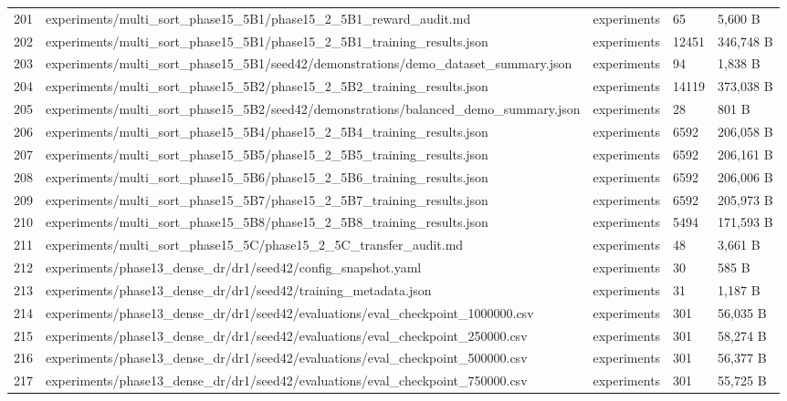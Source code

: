 \documentclass[11pt,a4paper,oneside]{book}
\begin{document}
\begin{longtable}{l l l l l}
201 & experiments/multi\_sort\_phase15\_5B1/phase15\_2\_5B1\_reward\_audit.md & experiments & 65 & 5,600 B \\
202 & experiments/multi\_sort\_phase15\_5B1/phase15\_2\_5B1\_training\_results.json & experiments & 12451 & 346,748 B \\
203 & experiments/multi\_sort\_phase15\_5B1/seed42/demonstrations/demo\_dataset\_summary.json & experiments & 94 & 1,838 B \\
204 & experiments/multi\_sort\_phase15\_5B2/phase15\_2\_5B2\_training\_results.json & experiments & 14119 & 373,038 B \\
205 & experiments/multi\_sort\_phase15\_5B2/seed42/demonstrations/balanced\_demo\_summary.json & experiments & 28 & 801 B \\
206 & experiments/multi\_sort\_phase15\_5B4/phase15\_2\_5B4\_training\_results.json & experiments & 6592 & 206,058 B \\
207 & experiments/multi\_sort\_phase15\_5B5/phase15\_2\_5B5\_training\_results.json & experiments & 6592 & 206,161 B \\
208 & experiments/multi\_sort\_phase15\_5B6/phase15\_2\_5B6\_training\_results.json & experiments & 6592 & 206,006 B \\
209 & experiments/multi\_sort\_phase15\_5B7/phase15\_2\_5B7\_training\_results.json & experiments & 6592 & 205,973 B \\
210 & experiments/multi\_sort\_phase15\_5B8/phase15\_2\_5B8\_training\_results.json & experiments & 5494 & 171,593 B \\
211 & experiments/multi\_sort\_phase15\_5C/phase15\_2\_5C\_transfer\_audit.md & experiments & 48 & 3,661 B \\
212 & experiments/phase13\_dense\_dr/dr1/seed42/config\_snapshot.yaml & experiments & 30 & 585 B \\
213 & experiments/phase13\_dense\_dr/dr1/seed42/training\_metadata.json & experiments & 31 & 1,187 B \\
214 & experiments/phase13\_dense\_dr/dr1/seed42/evaluations/eval\_checkpoint\_1000000.csv & experiments & 301 & 56,035 B \\
215 & experiments/phase13\_dense\_dr/dr1/seed42/evaluations/eval\_checkpoint\_250000.csv & experiments & 301 & 58,274 B \\
216 & experiments/phase13\_dense\_dr/dr1/seed42/evaluations/eval\_checkpoint\_500000.csv & experiments & 301 & 56,377 B \\
217 & experiments/phase13\_dense\_dr/dr1/seed42/evaluations/eval\_checkpoint\_750000.csv & experiments & 301 & 55,725 B \\

\end{longtable}
\end{document}
